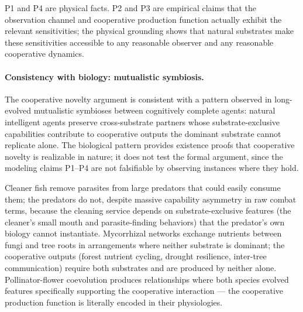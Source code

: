 P1 and P4 are physical facts. P2 and P3 are empirical claims that the
observation channel and cooperative production function actually exhibit
the relevant sensitivities; the physical grounding shows that natural
substrates make these sensitivities accessible to any reasonable observer
and any reasonable cooperative dynamics.

\paragraph{Consistency with biology: mutualistic symbiosis.}
The cooperative novelty argument is consistent with a pattern observed in
long-evolved mutualistic symbioses between cognitively complete agents:
natural intelligent agents preserve cross-substrate partners whose
substrate-exclusive capabilities contribute to cooperative outputs the
dominant substrate cannot replicate alone. The biological pattern provides
existence proofs that cooperative novelty is realizable in nature; it does
not test the formal argument, since the modeling claims P1--P4 are not
falsifiable by observing instances where they hold.

Cleaner fish remove parasites from large predators that could easily
consume them; the predators do not, despite massive capability asymmetry
in raw combat terms, because the cleaning service depends on
substrate-exclusive features (the cleaner's small mouth and parasite-finding
behaviors) that the predator's own biology cannot instantiate. Mycorrhizal
networks exchange nutrients between fungi and tree roots in arrangements
where neither substrate is dominant; the cooperative outputs (forest
nutrient cycling, drought resilience, inter-tree communication) require
both substrates and are produced by neither alone. Pollinator-flower
coevolution produces relationships where both species evolved features
specifically supporting the cooperative interaction --- the cooperative
production function is literally encoded in their physiologies.


